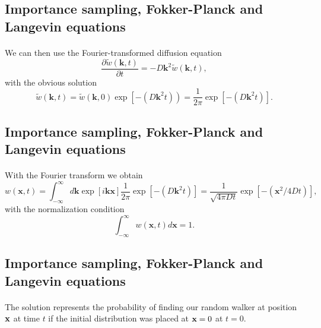\documentclass[%
twoside,                 %
final,                   %
10pt]{article}
\begin{document}
{{{{{{%
\subsection{Importance sampling, Fokker-Planck and Langevin equations}

\paragraph{}
We can then use the Fourier-transformed diffusion equation 
\[
    \frac{\partial \tilde{w}(\mathbf{k},t)}{\partial t} = -D\mathbf{k}^2\tilde{w}(\mathbf{k},t),
\]
with the obvious solution
\[
   \tilde{w}(\mathbf{k},t)=\tilde{w}(\mathbf{k},0)\exp{\left[-(D\mathbf{k}^2t)\right)}=
    \frac{1}{2\pi}\exp{\left[-(D\mathbf{k}^2t)\right]}. 
\]




\subsection{Importance sampling, Fokker-Planck and Langevin equations}

\paragraph{}
With the Fourier transform we obtain 
\[
   w(\mathbf{x},t)=\int_{-\infty}^{\infty}d\mathbf{k} \exp{\left[i\mathbf{kx}\right]}\frac{1}{2\pi}\exp{\left[-(D\mathbf{k}^2t)\right]}=
    \frac{1}{\sqrt{4\pi Dt}}\exp{\left[-(\mathbf{x}^2/4Dt)\right]}, 
\]
with the normalization condition
\[
   \int_{-\infty}^{\infty}w(\mathbf{x},t)d\mathbf{x}=1.
\]





\subsection{Importance sampling, Fokker-Planck and Langevin equations}

\paragraph{}
The solution represents the probability of finding
our random walker at position ${\bf x}$ at time $t$ if the initial distribution 
was placed at ${\bf x}=0$ at $t=0$. 

}}}}}}
\end{document}
